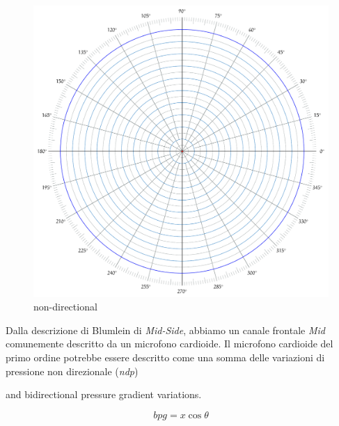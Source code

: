 \begin{figure}[h]
\centering
\includegraphics[width=1\columnwidth]{CAPITOLI/_TIKZ/POLAR/omni}
\caption{non-directional}
\label{fig:mspan}
\end{figure}


Dalla descrizione di Blumlein di \emph{Mid-Side}, abbiamo un canale frontale
\emph{Mid} comunemente descritto da un microfono cardioide. Il microfono
cardioide del primo ordine potrebbe essere descritto come una somma delle
variazioni di pressione non direzionale (\emph{ndp})

and bidirectional pressure gradient variations.

\begin{equation}
bpg = x\cos\theta
\label{eq:fig8}
\end{equation}

